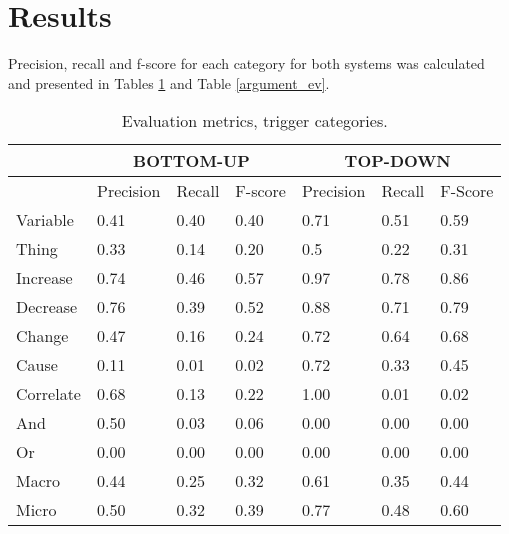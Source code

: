 \section{Results}

Precision, recall and f-score for each category for both systems was calculated and presented in Tables \ref{trigger_ev} and Table \ref{argument_ev}. 

\begin{table}
\begin{center}
\begin{tabular}{ | l | l | l | l | l | l | l | }
	\hline
	\cellcolor{gray} & \multicolumn{3}{c}{BOTTOM-UP} & \multicolumn{3}{c|}{TOP-DOWN} \\ \hline
	\cellcolor{gray} & Precision & Recall & F-score & Precision & Recall & F-Score \\ \hline
	Variable & 0.41 & 0.40 & 0.40 & 0.71 & 0.51 & 0.59 \\
	Thing & 0.33 & 0.14 & 0.20 & 0.5 & 0.22 & 0.31 \\
	Increase & 0.74 & 0.46 & 0.57 & 0.97 & 0.78 & 0.86 \\
	Decrease & 0.76 & 0.39 & 0.52 & 0.88 & 0.71 & 0.79 \\ 
	Change & 0.47 & 0.16 & 0.24 & 0.72 & 0.64 & 0.68 \\ 
	Cause & 0.11 & 0.01 & 0.02 & 0.72 & 0.33 & 0.45 \\ 
	Correlate & 0.68 & 0.13 & 0.22 & 1.00 & 0.01 & 0.02 \\ 
	And & 0.50 & 0.03 & 0.06 & 0.00 & 0.00 & 0.00 \\
	Or & 0.00 & 0.00 & 0.00 & 0.00 & 0.00 & 0.00 \\ \hline
	Macro & 0.44 & 0.25 & 0.32 & 0.61 & 0.35 & 0.44 \\
	Micro & 0.50 & 0.32 & 0.39 & 0.77 & 0.48 & 0.60 \\ \hline
\end{tabular}
\end{center}
\caption{Evaluation metrics, trigger categories.}
\label{trigger_ev}
\end{table}


